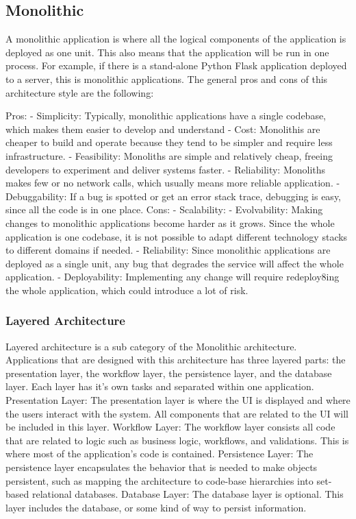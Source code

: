 \subsection[Monolithic]{Monolithic}
A monolithic application is where all the logical components of the application is deployed as one unit. 
This also means that the application will be run in one process. For example, if there is a stand-alone Python Flask application deployed to a server, 
this is monolithic applications. The general pros and cons of this architecture style are the following:

Pros:
-	Simplicity: Typically, monolithic applications have a single codebase, which makes them easier to develop and understand
-	Cost: Monolithis are cheaper to build and operate because they tend to be simpler and require less infrastructure.
-	Feasibility: Monoliths are simple and relatively cheap, freeing developers to experiment and deliver systems faster.
-	Reliability: Monoliths makes few or no network calls, which usually means more reliable application.
-	Debuggability: If a bug is spotted or get an error stack trace, debugging is easy, since all the code is in one place.
Cons: 
-	Scalability: 
-	Evolvability: Making changes to monolithic applications become harder as it grows. Since the whole application is one codebase, 
  it is not possible to adapt different technology stacks to different domains if needed.
-	Reliability: Since monolithic applications are deployed as a single unit, any bug that degrades the service will affect the whole application.
-	Deployability: Implementing any change will require redeploy8ing the whole application, which could introduce a lot of risk.

\subsubsection[Layered Architecture]{Layered Architecture}

Layered architecture is a sub category of the Monolithic architecture. Applications that are designed with this architecture has three layered parts: 
the presentation layer, the workflow layer, the persistence layer, and the database layer. Each layer has it’s own tasks and separated within one application. 
Presentation Layer:
	The presentation layer is where the UI is displayed and where the users interact with the system.
   All components that are related to the UI will be included in this layer.
Workflow Layer:
	The workflow layer consists all code that are related to logic such as business logic, workflows, and validations. This is where most of the application’s code is contained.
Persistence Layer:
	The persistence layer encapsulates the behavior that is needed to make objects persistent, 
  such as mapping the architecture to code-base hierarchies into set-based relational databases.
Database Layer:
	The database layer is optional. This layer includes the database, or some kind of way to persist information.

